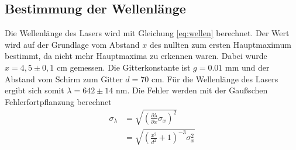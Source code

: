 \subsection{Bestimmung der Wellenlänge}
Die Wellenlänge des Lasers wird mit Gleichung \ref{eq:wellen} berechnet. Der Wert wird auf der Grundlage vom Abstand $x$ des
nullten zum ersten Hauptmaximum bestimmt, da nicht mehr Hauptmaxima zu erkennen waren.
Dabei wurde $x = 4,5\pm 0,1$ cm gemessen.
Die Gitterkonstante ist $g = 0.01$ mm und der Abstand vom Schirm zum Gitter $d = 70$ cm.
Für die Wellenlänge des Lasers ergibt sich somit $\lambda = 642\pm 14$ nm.
Die Fehler werden mit der Gaußschen Fehlerfortpflanzung berechnet
\begin{align}
  \sigma_{\lambda} &= \sqrt{\left(\frac{\partial \lambda}{\partial x}\sigma_x\right)^2}\nonumber\\
                   &= \sqrt{\left(\frac{x^2}{d^2}+1 \right)^{-3}\sigma_x^2}
  \label{eqn:gauß}
\end{align}